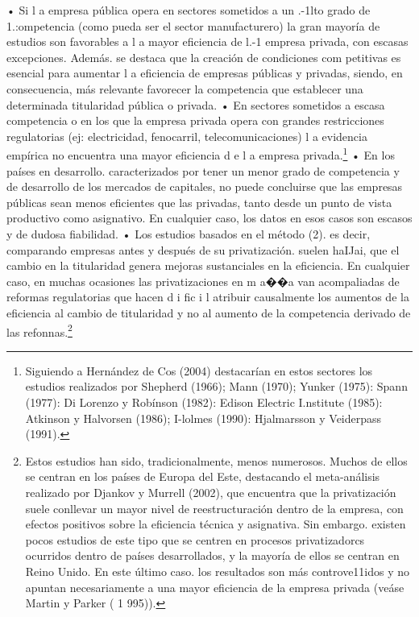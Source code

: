 \documentclass[10pt,a4paper]{article}
\begin{document}
• Si l a empresa pública opera en sectores sometidos a un .-1lto grado de 1.:ompetencia (como pueda ser el sector manufacturero) la gran mayoría de estudios son favorables a l a mayor eficiencia de l.-1 empresa privada, con escasas excepciones. Además. se destaca que la creación de condiciones com petitivas es esencial para aumentar l a eficiencia de empresas públicas y privadas, siendo, en consecuencia, más relevante favorecer la competencia que establecer una determinada titularidad pública o privada.
• En sectores sometidos a escasa competencia o en los que la empresa privada opera con grandes restricciones regulatorias (ej: electricidad, fenocarril, telecomunicaciones) l a evidencia empírica no encuentra una mayor eficiencia d e l a empresa privada.\footnote{%
    Siguiendo a Hernández de Cos (2004) destacarían en estos sectores los estudios realizados por Shepherd (1966); Mann (1970); Yunker (1975): Spann (1977): Di Lorenzo y Robínson (1982): Edison Electric I.nstitute (1985): Atkinson y Halvorsen (1986); I-lolmes (1990): Hjalmarsson y Veiderpass (1991).
}
• En los países en desarrollo. caracterizados por tener un menor grado de competencia y de desarrollo de los mercados de capitales, no puede concluirse que las empresas públicas sean menos eficientes que las privadas, tanto desde un punto de vista productivo como asignativo. En cualquier caso, los datos en esos casos son escasos y de dudosa fiabilidad.
• Los estudios basados en el método (2). es decir, comparando empresas antes y después de su privatización. suelen haIJai, que el cambio en la titularidad genera mejoras sustanciales en la eficiencia. En cualquier caso, en muchas ocasiones las privatizaciones en m a��a van acompaliadas de reformas regulatorias que hacen d i fic i l atribuir causalmente los aumentos de la eficiencia al cambio de titularidad y no al aumento de la competencia derivado de las refonnas.\footnote{%
    Estos estudios han sido, tradicionalmente, menos numerosos. Muchos de ellos se centran en los países de Europa del Este, destacando el meta-análisis realizado por Djankov y Murrell (2002), que encuentra que la privatización suele conllevar un mayor nivel de reestructuración dentro de la empresa, con efectos positivos sobre la eficiencia técnica y asignativa. Sin embargo. existen pocos estudios de este tipo que se centren en procesos privatizadorcs ocurridos dentro de países desarrollados, y la mayoría de ellos se centran en Reino Unido. En este último caso. los resultados son más controve11idos y no apuntan necesariamente a una mayor eficiencia de la empresa privada (veáse Martin y Parker ( 1 995)).
}
\end{document}
